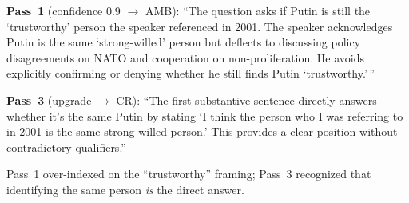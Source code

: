 \documentclass[11pt]{article}
\begin{document}
\begin{center}
{{\smallskip
\colorbox{bestrow}{\parbox{0.93\textwidth}{\textbf{Pass~1} (confidence 0.9 $\rightarrow$ AMB): ``The question asks if Putin is still the `trustworthy' person the speaker referenced in 2001. The speaker acknowledges Putin is the same `strong-willed' person but deflects to discussing policy disagreements on NATO and cooperation on non-proliferation. He avoids explicitly confirming or denying whether he still finds Putin `trustworthy.'\,''}}

\smallskip
\colorbox{bestrow}{\parbox{0.93\textwidth}{\textbf{Pass~3} (upgrade $\rightarrow$ CR): ``The first substantive sentence directly answers whether it's the same Putin by stating `I think the person who I was referring to in 2001 is the same strong-willed person.' This provides a clear position without contradictory qualifiers.''}}

\smallskip
{\footnotesize Pass~1 over-indexed on the ``trustworthy'' framing; Pass~3 recognized that identifying the same person \emph{is} the direct answer.}
}}

\end{center}

\clearpage
\end{document}
